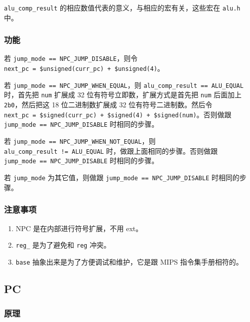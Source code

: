\texttt{alu\_comp\_result}
的相应数值代表的意义，与相应的宏有关，这些宏在 \texttt{alu.h} 中。

\hypertarget{ux529fux80fd-1}{%
\subsubsection{功能}\label{ux529fux80fd-1}}

若 \texttt{jump\_mode\ ==\ NPC\_JUMP\_DISABLE}，则令
\texttt{next\_pc\ =\ \$unsigned(curr\_pc)\ +\ \$unsigned(4)}。

若 \texttt{jump\_mode\ ==\ NPC\_JUMP\_WHEN\_EQUAL}，则
\texttt{alu\_comp\_result\ ==\ ALU\_EQUAL} 时，首先把 \texttt{num}
扩展成 32 位有符号立即数，扩展方式是首先把 \texttt{num} 后面加上
\texttt{2\textquotesingle{}b0}，然后把这 18 位二进制数扩展成 32
位有符号二进制数。然后令
\texttt{next\_pc\ =\ \$signed(curr\_pc)\ +\ \$signed(4)\ +\ \$signed(num)}。否则做跟
\texttt{jump\_mode\ ==\ NPC\_JUMP\_DISABLE} 时相同的步骤。

若 \texttt{jump\_mode\ ==\ NPC\_JUMP\_WHEN\_NOT\_EQUAL}，则
\texttt{alu\_comp\_result\ !=\ ALU\_EQUAL}
时，做跟上面相同的步骤。否则做跟
\texttt{jump\_mode\ ==\ NPC\_JUMP\_DISABLE} 时相同的步骤。

若 \texttt{jump\_mode} 为其它值，则做跟
\texttt{jump\_mode\ ==\ NPC\_JUMP\_DISABLE} 时相同的步骤。

\hypertarget{ux6ce8ux610fux4e8bux9879}{%
\subsubsection{注意事项}\label{ux6ce8ux610fux4e8bux9879}}

\begin{enumerate}
\def\labelenumi{\arabic{enumi}.}
\tightlist
\item
  NPC 是在内部进行符号扩展，不用 ext。
\item
  \texttt{reg\_} 是为了避免和 \texttt{reg} 冲突。
\item
  \texttt{base} 抽象出来是为了方便调试和维护，它是跟 MIPS
  指令集手册相符的。
\end{enumerate}

\hypertarget{pc}{%
\subsection{PC}\label{pc}}

\hypertarget{ux539fux7406}{%
\subsubsection{原理}\label{ux539fux7406}}

